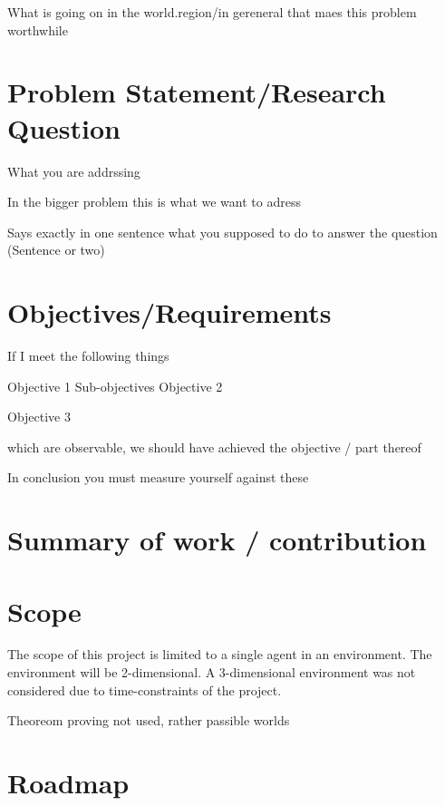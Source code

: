 What is going on in the world.region/in gereneral that maes this problem worthwhile

\section{Problem Statement/Research Question}

What you are addrssing

In the bigger problem this is what we want to adress

Says exactly in one sentence what you supposed to do to answer the question (Sentence or two)

\section{Objectives/Requirements}

If I meet the following things

Objective 1
	Sub-objectives
Objective 2

Objective 3

which are observable, we should have achieved the objective / part thereof

In conclusion you must measure yourself against these

\section{Summary of work / contribution}



\section{Scope}

The scope of this project is limited to a single agent in an environment.
The environment will be 2-dimensional. A 3-dimensional environment was not considered due to time-constraints of the project.

Theoreom proving not used, rather passible worlds

\section{Roadmap}




